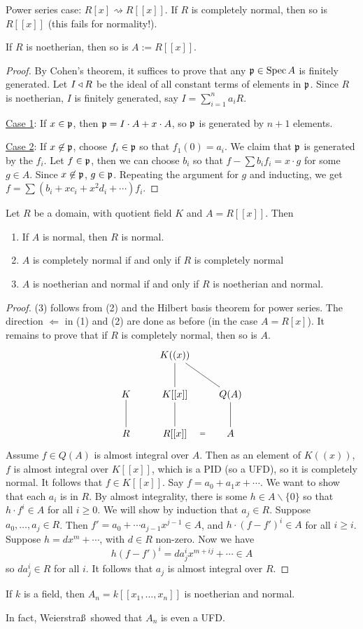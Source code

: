  \medskip
 Power series case: $R[x]\rightsquigarrow R[[x]]$. If $R$ is completely normal, then so
 is $R[[x]]$ (this fails for normality!).
 \begin{theorem}
   If $R$ is noetherian, then so is $A:=R[[x]]$.
 \end{theorem}
 \begin{proof}
   By Cohen's theorem, it suffices to prove that any $\mathfrak{p}\in \operatorname{Spec} A$ is finitely
   generated. Let $I\triangleleft R$ be the ideal of all constant terms of elements in $\mathfrak{p}$. Since
   $R$ is noetherian, $I$ is finitely generated, say $I=\sum_{i=1}^n a_i R$.

   \underline{Case 1}: If $x\in \mathfrak{p}$, then $\mathfrak{p}=I\cdot A + x\cdot A$, so $\mathfrak{p}$ is
   generated by $n+1$ elements.

   \underline{Case 2}: If $x\not\in \mathfrak{p}$, choose $f_i\in \mathfrak{p}$ so that $f_1(0)=a_i$. We
   claim that $\mathfrak{p}$ is generated by the $f_i$. Let $f\in \mathfrak{p}$, then we can choose $b_i$ so
   that $f-\sum b_i f_i = x\cdot g$ for some $g\in A$. Since $x\not\in \mathfrak{p}$, $g\in \mathfrak{p}$.
   Repeating the argument for $g$ and inducting, we get $f=\sum
   (b_i+xc_i+x^2d_i+\cdots)f_i$.
 \end{proof}
 \begin{theorem}
   Let $R$ be a domain, with quotient field $K$ and $A=R[[x]]$. Then
   \begin{enumerate}
     \item If $A$ is normal, then $R$ is normal.
     \item $A$ is completely normal if and only if $R$ is completely normal
     \item $A$ is noetherian and normal if and only if $R$ is noetherian and normal.
   \end{enumerate}
 \end{theorem}
 \begin{proof}
   (3) follows from (2) and the Hilbert basis theorem for power series. The direction
   $\Leftarrow$ in (1) and (2) are done as before (in the case $A=R[x]$). It remains to
   prove that if $R$ is completely normal, then so is $A$.
   \[\xymatrix{
    & K((x)) \ar@{-}[dr] \ar@{-}[d]\\
    K\ar@{-}[d] & K[[x]]\ar@{-}[d] & Q(A) \ar@{-}[d]\\
    R & R[[x]] \ar@{}[r]|{=}& A
   }\]
   Assume $f\in Q(A)$ is almost integral over $A$. Then as an element of $K((x))$, $f$ is
   almost integral over $K[[x]]$, which is a PID (so a UFD), so it is completely normal.
   It follows that $f\in K[[x]]$. Say $f=a_0 + a_1x+ \cdots$. We want to show that each
   $a_i$ is in $R$. By almost integrality, there is some $h\in A\smallsetminus \{0\}$ so
   that $h\cdot f^i\in A$ for all $i\ge 0$. We will show by induction that $a_j\in R$.
   Suppose $a_0,\dots, a_j\in R$. Then $f'=a_0+\cdots a_{j-1}x^{j-1}\in A$, and $h\cdot
   (f-f')^i \in A$ for all $i\ge i$. Suppose $h=dx^m+ \cdots$, with $d\in R$ non-zero.
   Now we have
   \[
    h(f-f')^i = da_j^i x^{m+ij} + \cdots \in A
   \]
   so $da_j^i\in R$ for all $i$. It follows that $a_j$ is almost integral over $R$.
 \end{proof}
  \begin{corollary}
   If $k$ is a field, then $A_n=k[[x_1,\dots, x_n]]$ is noetherian and normal.
 \end{corollary}
 In fact, Weierstra\ss\ showed that $A_n$ is even a UFD.
